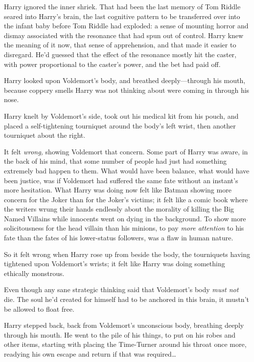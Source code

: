 Harry ignored the inner shriek. That had been the last memory of Tom Riddle seared into Harry’s brain, the last cognitive pattern to be transferred over into the infant baby before Tom Riddle had exploded: a sense of mounting horror and dismay associated with the resonance that had spun out of control. Harry knew the meaning of it now, that sense of apprehension, and that made it easier to disregard. He’d guessed that the effect of the resonance mostly hit the caster, with power proportional to the caster’s power, and the bet had paid off.

Harry looked upon Voldemort’s body, and breathed deeply—through his mouth, because coppery smells Harry was not thinking about were coming in through his nose.

Harry knelt by Voldemort’s side, took out his medical kit from his pouch, and placed a self-tightening tourniquet around the body’s left wrist, then another tourniquet about the right.

It felt \emph{wrong,} showing Voldemort that concern. Some part of Harry was aware, in the back of his mind, that some number of people had just had something extremely bad happen to them. What would have been balance, what would have been justice, was if Voldemort had suffered the same fate without an instant’s more hesitation. What Harry was doing now felt like Batman showing more concern for the Joker than for the Joker’s victims; it felt like a comic book where the writers wrung their hands endlessly about the morality of killing the Big Named Villains while innocents went on dying in the background. To show more solicitousness for the head villain than his minions, to pay \emph{more attention} to his fate than the fates of his lower-status followers, was a flaw in human nature.

So it felt wrong when Harry rose up from beside the body, the tourniquets having tightened upon Voldemort’s wrists; it felt like Harry was doing something ethically monstrous.

Even though any sane strategic thinking said that Voldemort’s body \emph{must not} die. The soul he’d created for himself had to be anchored in this brain, it mustn’t be allowed to float free.

Harry stepped back, back from Voldemort’s unconscious body, breathing deeply through his mouth. He went to the pile of his things, to put on his robes and other items, starting with placing the Time-Turner around his throat once more, readying his own escape and return if that was required…

